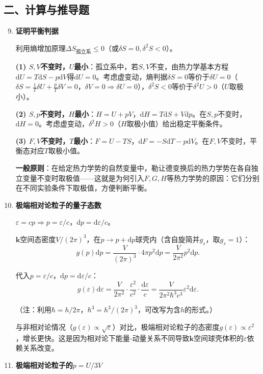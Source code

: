 \documentclass[12pt,a4paper,fontset=mac]{ctexart}
\newcommand{\kk}{\mathbf{k}}
\newcommand{\dd}{\mathrm{d}}
\newcommand{\đ}{\mathrm{đ}}
\begin{document}
\subsection*{二、计算与推导题}

\begin{enumerate}
\setcounter{enumi}{8}

\item \textbf{证明平衡判据}

利用熵增加原理$\Delta S_{\text{孤立系}}\le0$（或$\delta S=0,\delta^2S<0$）。

\textbf{(1) $S,V$不变时，$U$最小}：孤立系中，若$S,V$不变，由热力学基本方程$\dd U=T\dd S-p\dd V$得$\dd U=0$。考虑虚变动，熵判据$\delta S=0$等价于$\delta U=0$（$\delta S=\frac{1}{T}\delta U+\frac{p}{T}\delta V=0$，$\delta V=0\Rightarrow\delta U=0$），$\delta^2S<0$等价于$\delta^2U>0$（$U$取极小）。

\textbf{(2) $S,p$不变时，$H$最小}：$H=U+pV$，$\dd H=T\dd S+V\dd p$。在$S,p$不变时，$\dd H=0$。考虑虚变动，$\delta^2H>0$（$H$取极小值）给出稳定平衡条件。

\textbf{(3) $F,V$不变时，$T$最小}：$F=U-TS$，$\dd F=-S\dd T-p\dd V$。在$F,V$不变时，平衡态对应$T$取极小值。

\textbf{一般原则}：在给定热力学势的自然变量中，勒让德变换后的热力学势在各自独立变量不变时取极值——这就是为何引入$F,G,H$等热力学势的原因：它们分别在不同实验条件下取极值，方便判断平衡。

\item \textbf{极端相对论粒子的量子态数}

$\varepsilon=cp\Rightarrow p=\varepsilon/c$，$\dd p=\dd\varepsilon/c$。

$\kk$空间态密度$V/(2\pi)^3$，在$p\to p+\dd p$球壳内（含自旋简并$g_s$，取$g_s=1$）：
\[g(p)\dd p = \frac{V}{(2\pi)^3}\cdot4\pi p^2\dd p = \frac{V}{2\pi^2}p^2\dd p.\]

代入$p=\varepsilon/c$，$\dd p=\dd\varepsilon/c$：
\[g(\varepsilon)\dd\varepsilon = \frac{V}{2\pi^2}\cdot\frac{\varepsilon^2}{c^2}\cdot\frac{\dd\varepsilon}{c} = \frac{V}{2\pi^2\hbar^3 c^3}\varepsilon^2\dd\varepsilon.\]

（注：利用$\hbar=h/2\pi$，$\hbar^3=h^3/(2\pi)^3$，可改写为含$h$的形式。）

与非相对论情况（$g(\varepsilon)\propto\sqrt{\varepsilon}$）对比，极端相对论粒子的态密度$g(\varepsilon)\propto\varepsilon^2$，增长更快。这是因为相对论下能量-动量关系不同导致$\kk$空间球壳体积的$\varepsilon$依赖关系改变。

\item \textbf{极端相对论粒子的$p=U/3V$}


\end{enumerate}
\end{document}
